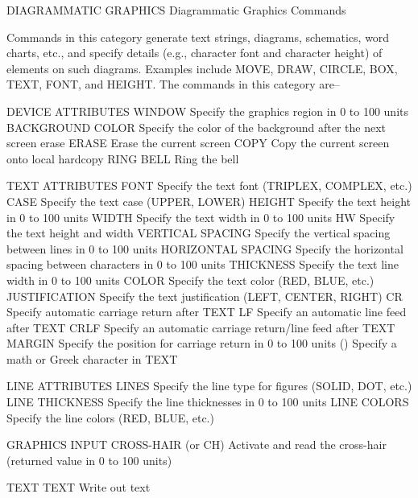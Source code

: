 DIAGRAMMATIC GRAPHICS
Diagrammatic Graphics Commands
 
Commands in this category generate text strings, diagrams, schematics,
word charts, etc., and specify details (e.g., character font and
character height) of elements on such diagrams.  Examples include
MOVE, DRAW, CIRCLE, BOX, TEXT, FONT, and HEIGHT.  The commands in this
category are--
 
DEVICE ATTRIBUTES
   WINDOW                Specify the graphics region in 0 to 100 units
   BACKGROUND COLOR      Specify the color of the background after the
                         next screen erase
   ERASE                 Erase the current screen
   COPY                  Copy the current screen onto local hardcopy
   RING BELL             Ring the bell
 
TEXT ATTRIBUTES
   FONT                  Specify the text font (TRIPLEX, COMPLEX, etc.)
   CASE                  Specify the text case (UPPER, LOWER)
   HEIGHT                Specify the text height in 0 to 100 units
   WIDTH                 Specify the text width in 0 to 100 units
   HW                    Specify the text height and width
   VERTICAL SPACING      Specify the vertical spacing between lines in
                         0 to 100 units
   HORIZONTAL SPACING    Specify the horizontal spacing between
                         characters in 0 to 100 units
   THICKNESS             Specify the text line width in 0 to 100 units
   COLOR                 Specify the text color (RED, BLUE, etc.)
   JUSTIFICATION         Specify the text justification (LEFT, CENTER,
                         RIGHT)
   CR                    Specify automatic carriage return after TEXT
   LF                    Specify an automatic line feed after TEXT
   CRLF                  Specify an automatic carriage return/line feed
                         after TEXT
   MARGIN                Specify the position for carriage return in 0
                         to 100 units
   ()                    Specify a math or Greek character in TEXT
 
LINE ATTRIBUTES
   LINES                 Specify the line type for figures (SOLID, DOT,
                         etc.)
   LINE THICKNESS        Specify the line thicknesses in 0 to 100 units
   LINE COLORS           Specify the line colors (RED, BLUE, etc.)
 
GRAPHICS INPUT
   CROSS-HAIR (or CH)    Activate and read the cross-hair (returned
                         value in 0 to 100 units)
 
TEXT
   TEXT                  Write out text
 
